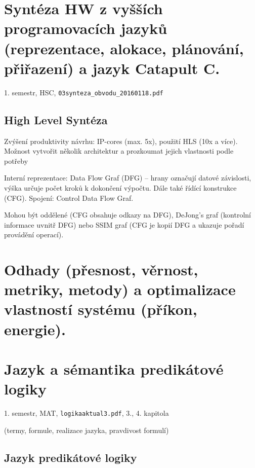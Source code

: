 \documentclass[a4paper, 11pt]{report}
\begin{document}
\chapter{Syntéza HW z vyšších programovacích jazyků (reprezentace, alokace, plánování, přiřazení) a jazyk Catapult C.} \label{cha:4}
1. semestr, HSC, \texttt{03synteza\_obvodu\_20160118.pdf}

\section{High Level Syntéza}
Zvýšení produktivity návrhu: IP-cores (max. 5x), použití HLS (10x a více). Možnost vytvořit několik architektur a prozkoumat jejich vlastnosti podle potřeby

Interní reprezentace: Data Flow Graf (DFG) -- hrany označují datové závislosti, výška určuje počet kroků k dokončení výpočtu. Dále také řídící konstrukce (CFG). Spojení: Control Data Flow Graf.

Mohou být oddělené (CFG obsahuje odkazy na DFG), DeJong's graf (kontrolní informace uvnitř DFG) nebo SSIM graf (CFG je kopií DFG a ukazuje pořadí provádění operací).


\chapter{Odhady (přesnost, věrnost, metriky, metody) a optimalizace vlastností systému (příkon, energie).} \label{cha:5}

\chapter{Jazyk a sémantika predikátové logiky} \label{cha:6}
1. semestr, MAT, \texttt{logikaaktual3.pdf}, 3., 4. kapitola

(termy, formule, realizace jazyka, pravdivost formulí)

\section{Jazyk predikátové logiky}
\end{document}
